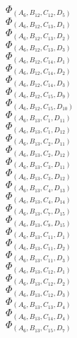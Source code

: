 \documentclass[14pt]{article}
\begin{document}
    $\Phi_{({A}_{6}, {B}_{12}, {C}_{12}, {D}_{5})}$ \\ 
    $\Phi_{({A}_{6}, {B}_{12}, {C}_{13}, {D}_{1})}$ \\ 
    $\Phi_{({A}_{6}, {B}_{12}, {C}_{13}, {D}_{2})}$ \\ 
    $\Phi_{({A}_{6}, {B}_{12}, {C}_{13}, {D}_{3})}$ \\ 
    $\Phi_{({A}_{6}, {B}_{12}, {C}_{14}, {D}_{1})}$ \\ 
    $\Phi_{({A}_{6}, {B}_{12}, {C}_{14}, {D}_{2})}$ \\ 
    $\Phi_{({A}_{6}, {B}_{12}, {C}_{14}, {D}_{3})}$ \\ 
    $\Phi_{({A}_{6}, {B}_{12}, {C}_{15}, {D}_{9})}$ \\ 
    $\Phi_{({A}_{6}, {B}_{12}, {C}_{15}, {D}_{10})}$ \\ 
    $\Phi_{({A}_{6}, {B}_{13}, {C}_{1}, {D}_{11})}$ \\ 
    $\Phi_{({A}_{6}, {B}_{13}, {C}_{1}, {D}_{12})}$ \\ 
    $\Phi_{({A}_{6}, {B}_{13}, {C}_{2}, {D}_{11})}$ \\ 
    $\Phi_{({A}_{6}, {B}_{13}, {C}_{2}, {D}_{12})}$ \\ 
    $\Phi_{({A}_{6}, {B}_{13}, {C}_{3}, {D}_{11})}$ \\ 
    $\Phi_{({A}_{6}, {B}_{13}, {C}_{3}, {D}_{12})}$ \\ 
    $\Phi_{({A}_{6}, {B}_{13}, {C}_{4}, {D}_{13})}$ \\ 
    $\Phi_{({A}_{6}, {B}_{13}, {C}_{4}, {D}_{14})}$ \\ 
    $\Phi_{({A}_{6}, {B}_{13}, {C}_{7}, {D}_{15})}$ \\ 
    $\Phi_{({A}_{6}, {B}_{13}, {C}_{8}, {D}_{15})}$ \\ 
    $\Phi_{({A}_{6}, {B}_{13}, {C}_{11}, {D}_{1})}$ \\ 
    $\Phi_{({A}_{6}, {B}_{13}, {C}_{11}, {D}_{2})}$ \\ 
    $\Phi_{({A}_{6}, {B}_{13}, {C}_{11}, {D}_{3})}$ \\ 
    $\Phi_{({A}_{6}, {B}_{13}, {C}_{12}, {D}_{1})}$ \\ 
    $\Phi_{({A}_{6}, {B}_{13}, {C}_{12}, {D}_{2})}$ \\ 
    $\Phi_{({A}_{6}, {B}_{13}, {C}_{12}, {D}_{3})}$ \\ 
    $\Phi_{({A}_{6}, {B}_{13}, {C}_{13}, {D}_{4})}$ \\ 
    $\Phi_{({A}_{6}, {B}_{13}, {C}_{14}, {D}_{4})}$ \\ 
    $\Phi_{({A}_{6}, {B}_{13}, {C}_{15}, {D}_{7})}$ \\ 
\end{document}
